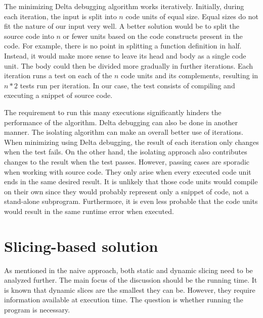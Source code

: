 
The minimizing Delta debugging algorithm works iteratively.
Initially, during each iteration, the input is split into $n$ code units 
of equal size.
Equal sizes do not fit the nature of our input very well.
A better solution would be to split the source code into $n$ or fewer units 
based on the code constructs present in the code.
For example, there is no point in splitting a function definition in half.
Instead, it would make more sense to leave its head and body as a single 
code unit.
The body could then be divided more gradually in further iterations.
Each iteration runs a test on each of the $n$ code units and its 
complements, resulting in $n * 2$ tests run per iteration.
In our case, the test consists of compiling and executing a snippet of 
source code.

The requirement to run this many executions significantly hinders 
the performance of the algorithm.
Delta debugging can also be done in another manner.
The isolating algorithm can make an overall better use of iterations.
When minimizing using Delta debugging, the result of each iteration 
only changes when the test fails.
On the other hand, the isolating approach also contributes changes 
to the result when the test passes.
However, passing cases are sporadic when working with source code.
They only arise when every executed code unit ends in the same desired 
result.
It is unlikely that those code units would compile on their own since 
they would probably represent only a snippet of code, not a stand-alone 
subprogram.
Furthermore, it is even less probable that the code units would result 
in the same runtime error when executed.



\section{Slicing-based solution}

As mentioned in the naive approach, both static and dynamic slicing need 
to be analyzed further.
The main focus of the discussion should be the running time.
It is known that dynamic slices are the smallest they can be.
However, they require information available at execution time.
The question is whether running the program is necessary.

